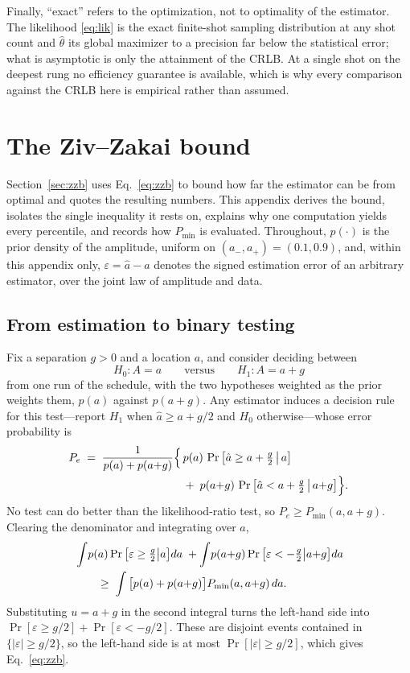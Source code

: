 \documentclass[%
 twocolumn,
 amsmath,amssymb,
prx,
longbibliography
]{revtex4-2}
\begin{document}
Finally, ``exact'' refers to the optimization, not to optimality of the estimator. The likelihood \eqref{eq:lik} is the exact finite-shot sampling distribution at any shot count and $\hat\theta$ its global maximizer to a precision far below the statistical error; what is asymptotic is only the attainment of the \ac{CRLB}. At a single shot on the deepest rung no efficiency guarantee is available, which is why every comparison against the \ac{CRLB} here is empirical rather than assumed.

\section{The Ziv--Zakai bound}\label{app:zzb}

Section~\ref{sec:zzb} uses Eq.~\eqref{eq:zzb} to bound how far the estimator can be from optimal and quotes the resulting numbers. This appendix derives the bound, isolates the single inequality it rests on, explains why one computation yields every percentile, and records how $P_{\min}$ is evaluated. Throughout, $p(\cdot)$ is the prior density of the amplitude, uniform on $(a_-, a_+) = (0.1, 0.9)$, and, within this appendix only, $\varepsilon = \hat a - a$ denotes the signed estimation error of an arbitrary estimator, over the joint law of amplitude and data.

\subsection{From estimation to binary testing}\label{app:zzb:derive}

Fix a separation $g > 0$ and a location $a$, and consider deciding between
\begin{equation*}
    H_0: A = a \qquad\text{versus}\qquad H_1: A = a + g
\end{equation*}
from one run of the schedule, with the two hypotheses weighted as the prior weights them, $p(a)$ against $p(a{+}g)$. Any estimator induces a decision rule for this test---report $H_1$ when $\hat a \ge a + g/2$ and $H_0$ otherwise---whose error probability is
\begin{align}\label{eq:induced}
    P_e \;=\; \frac{1}{p(a) + p(a{+}g)}\Big\{\,& p(a)\,\Pr\big[\hat a \ge a + \tfrac{g}{2} \,\big|\, a\big] \notag\\
    &+\; p(a{+}g)\,\Pr\big[\hat a < a + \tfrac{g}{2} \,\big|\, a{+}g\big]\Big\} .
\end{align}
No test can do better than the likelihood-ratio test, so $P_e \ge P_{\min}(a, a{+}g)$. Clearing the denominator and integrating over $a$,
\begin{align}
    &\int \! p(a) \Pr\big[\varepsilon \ge \tfrac{g}{2} \big| a\big] da \;+ \int \! p(a{+}g) \Pr\big[\varepsilon < -\tfrac{g}{2} \big| a{+}g\big] da \notag \\
    &\qquad \ge\; \int \big[p(a) + p(a{+}g)\big] P_{\min}(a, a{+}g)\, da .
\end{align}
Substituting $u = a + g$ in the second integral turns the left-hand side into $\Pr[\varepsilon \ge g/2] + \Pr[\varepsilon < -g/2]$. These are disjoint events contained in $\{|\varepsilon| \ge g/2\}$, so the left-hand side is at most $\Pr[|\varepsilon| \ge g/2]$, which gives Eq.~\eqref{eq:zzb}.
\end{document}
